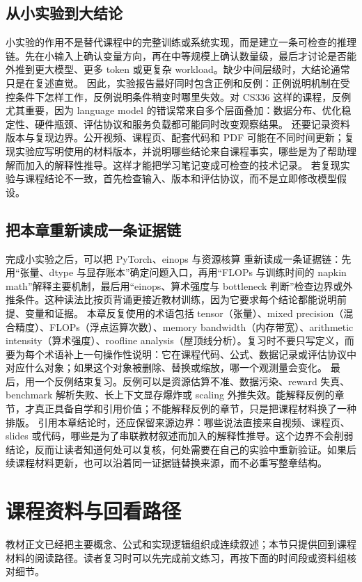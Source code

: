 \documentclass[a4paper]{article}
\begin{document}
\subsection{从小实验到大结论}
小实验的作用不是替代课程中的完整训练或系统实现，而是建立一条可检查的推理链。先在小输入上确认变量方向，再在中等规模上确认数量级，最后才讨论是否能外推到更大模型、更多 token 或更复杂 workload。缺少中间层级时，大结论通常只是在复述直觉。
因此，实验报告最好同时包含正例和反例：正例说明机制在受控条件下怎样工作，反例说明条件稍变时哪里失效。对 CS336 这样的课程，反例尤其重要，因为 language model 的错误常来自多个层面叠加：数据分布、优化稳定性、硬件瓶颈、评估协议和服务负载都可能同时改变观察结果。
还要记录资料版本与复现边界。公开视频、课程页、配套代码和 PDF 可能在不同时间更新；复现实验应写明使用的材料版本，并说明哪些结论来自课程事实，哪些是为了帮助理解而加入的解释性推导。这样才能把学习笔记变成可检查的技术记录。
若复现实验与课程结论不一致，首先检查输入、版本和评估协议，而不是立即修改模型假设。
\subsection{把本章重新读成一条证据链}
完成小实验之后，可以把 PyTorch、einops 与资源核算 重新读成一条证据链：先用“张量、dtype 与显存账本”确定问题入口，再用“FLOPs 与训练时间的 napkin math”解释主要机制，最后用“einops、算术强度与 bottleneck 判断”检查边界或外推条件。这种读法比按页背诵更接近教材训练，因为它要求每个结论都能说明前提、变量和证据。
本章反复使用的术语包括 tensor（张量）、mixed precision（混合精度）、FLOPs（浮点运算次数）、memory bandwidth（内存带宽）、arithmetic intensity（算术强度）、roofline analysis（屋顶线分析）。复习时不要只写定义，而要为每个术语补上一句操作性说明：它在课程代码、公式、数据记录或评估协议中对应什么对象；如果这个对象被删除、替换或缩放，哪一个观测量会变化。
最后，用一个反例结束复习。反例可以是资源估算不准、数据污染、reward 失真、benchmark 解析失败、长上下文显存爆炸或 scaling 外推失效。能解释反例的章节，才真正具备自学和引用价值；不能解释反例的章节，只是把课程材料换了一种排版。
引用本章结论时，还应保留来源边界：哪些说法直接来自视频、课程页、slides 或代码，哪些是为了串联教材叙述而加入的解释性推导。这个边界不会削弱结论，反而让读者知道何处可以复核，何处需要在自己的实验中重新验证。如果后续课程材料更新，也可以沿着同一证据链替换来源，而不必重写整章结构。
\section{课程资料与回看路径}
教材正文已经把主要概念、公式和实现逻辑组织成连续叙述；本节只提供回到课程材料的阅读路径。读者复习时可以先完成前文练习，再按下面的时间段或资料组核对细节。
\end{document}
